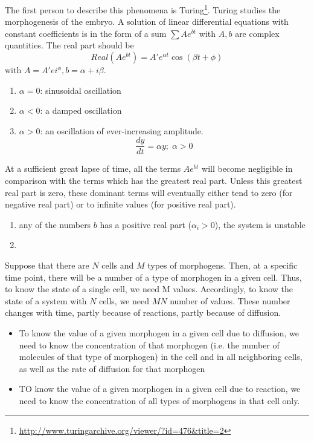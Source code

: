 The first person to describe this phenomena is
Turing\cite{turing1952cbm}\footnote{\url{http://www.turingarchive.org/viewer/?id=476&title=2}}.
Turing studies the morphogenesis of the embryo. A solution of linear
differential equations with constant coefficients is in the form of a
sum $\sum A e^{bt}$ with $A, b$ are complex quantities. The real part
should be
\begin{equation}
  \label{eq:219}
  Real(Ae^{bt})=A'e^{\alpha t} \cos(\beta t + \phi)
\end{equation}
with $A=A'ei^\phi, b=\alpha+i\beta$.

\begin{enumerate}
\item $\alpha=0$: sinusoidal oscillation
\item $\alpha<0$: a damped oscillation
\item $\alpha>0$: an oscillation of ever-increasing amplitude.
  \begin{equation}
    \label{eq:220}
    \frac{dy}{dt} = \alpha y; \; \alpha > 0
  \end{equation}
\end{enumerate}
At a sufficient great lapse of time, all the terms $Ae^{bt}$ will
become negligible in comparison with the terms which has the greatest
real part. Unless this greatest real part is zero, these dominant
terms will eventually either tend to zero (for negative real part) or
to infinite values (for positive real part).

\begin{enumerate}
\item any of the numbers $b$ has a positive real part ($\alpha_i>0$),
  the system is unstable
\item 
\end{enumerate}


Suppose that there are $N$ cells and $M$ types of morphogens. Then, at
a specific time point, there will be a number of a type of morphogen
in a given cell. Thus, to know the state of a single cell, we need M
values. Accordingly, to know the state of a system with $N$ cells, we
need $MN$ number of values. These number changes with time, partly
because of reactions, partly because of diffusion.

\begin{itemize}
\item To know the value of a given morphogen in a given cell due to
  diffusion, we need to know the concentration of that morphogen
  (i.e. the number of molecules of that type of morphogen) in the cell
  and in all neighboring cells, as well as the rate of diffusion for
  that morphogen
\item TO know the value of a given morphogen in a given cell due to
  reaction, we need to know the concentration of all types of
  morphogens in that cell only. 
\end{itemize}


